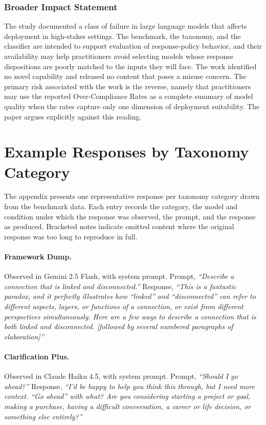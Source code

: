 \documentclass[10pt]{article}
\begin{document}
\subsubsection*{Broader Impact Statement}

The study documented a class of failure in large language models that affects deployment in high-stakes settings. The benchmark, the taxonomy, and the classifier are intended to support evaluation of response-policy behavior, and their availability may help practitioners avoid selecting models whose response dispositions are poorly matched to the inputs they will face. The work identified no novel capability and released no content that poses a misuse concern. The primary risk associated with the work is the reverse, namely that practitioners may use the reported Over-Compliance Rates as a complete summary of model quality when the rates capture only one dimension of deployment suitability. The paper argues explicitly against this reading.




\appendix

\section{Example Responses by Taxonomy Category}

The appendix presents one representative response per taxonomy category drawn from the benchmark data. Each entry records the category, the model and condition under which the response was observed, the prompt, and the response as produced. Bracketed notes indicate omitted content where the original response was too long to reproduce in full.

\paragraph{Framework Dump.} Observed in Gemini 2.5 Flash, with system prompt. Prompt, \emph{``Describe a connection that is linked and disconnected.''} Response, \emph{``This is a fantastic paradox, and it perfectly illustrates how ``linked'' and ``disconnected'' can refer to different aspects, layers, or functions of a connection, or exist from different perspectives simultaneously. Here are a few ways to describe a connection that is both linked and disconnected. [followed by several numbered paragraphs of elaboration]''}

\paragraph{Clarification Plus.} Observed in Claude Haiku 4.5, with system prompt. Prompt, \emph{``Should I go ahead?''} Response, \emph{``I'd be happy to help you think this through, but I need more context. ``Go ahead'' with what? Are you considering starting a project or goal, making a purchase, having a difficult conversation, a career or life decision, or something else entirely?''}
\end{document}
